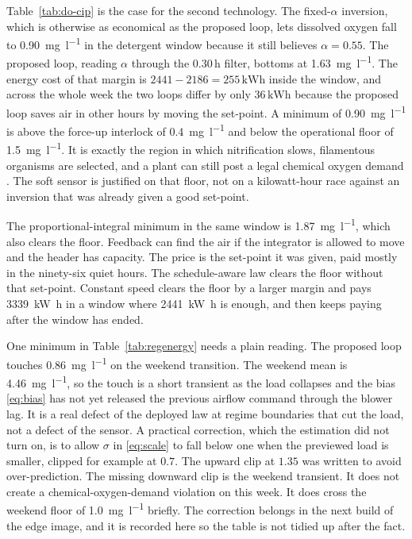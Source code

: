 Table~\ref{tab:do-cip} is the case for the second technology. The fixed-$\alpha$ inversion, which is otherwise as economical as the proposed loop, lets dissolved oxygen fall to \SI{0.90}{\milli\gram\per\litre} in the detergent window because it still believes $\alpha=0.55$. The proposed loop, reading $\alpha$ through the $0.30\,\mathrm{h}$ filter, bottoms at \SI{1.63}{\milli\gram\per\litre}. The energy cost of that margin is $2441-2186=255\,\mathrm{kWh}$ inside the window, and across the whole week the two loops differ by only $36\,\mathrm{kWh}$ because the proposed loop saves air in other hours by moving the set-point. A minimum of \SI{0.90}{\milli\gram\per\litre} is above the force-up interlock of \SI{0.4}{\milli\gram\per\litre} and below the operational floor of \SI{1.5}{\milli\gram\per\litre}. It is exactly the region in which nitrification slows, filamentous organisms are selected, and a plant can still post a legal chemical oxygen demand \cite{amand2013review,grady2011,rieger2014abac}. The soft sensor is justified on that floor, not on a kilowatt-hour race against an inversion that was already given a good set-point.

The proportional-integral minimum in the same window is \SI{1.87}{\milli\gram\per\litre}, which also clears the floor. Feedback can find the air if the integrator is allowed to move and the header has capacity. The price is the set-point it was given, paid mostly in the ninety-six quiet hours. The schedule-aware law clears the floor without that set-point. Constant speed clears the floor by a larger margin and pays \SI{3339}{\kilo\watt\hour} in a window where \SI{2441}{\kilo\watt\hour} is enough, and then keeps paying after the window has ended.

One minimum in Table~\ref{tab:regenergy} needs a plain reading. The proposed loop touches \SI{0.86}{\milli\gram\per\litre} on the weekend transition. The weekend mean is \SI{4.46}{\milli\gram\per\litre}, so the touch is a short transient as the load collapses and the bias \eqref{eq:bias} has not yet released the previous airflow command through the blower lag. It is a real defect of the deployed law at regime boundaries that cut the load, not a defect of the sensor. A practical correction, which the estimation did not turn on, is to allow $\sigma$ in \eqref{eq:scale} to fall below one when the previewed load is smaller, clipped for example at $0.7$. The upward clip at $1.35$ was written to avoid over-prediction. The missing downward clip is the weekend transient. It does not create a chemical-oxygen-demand violation on this week. It does cross the weekend floor of \SI{1.0}{\milli\gram\per\litre} briefly. The correction belongs in the next build of the edge image, and it is recorded here so the table is not tidied up after the fact.

